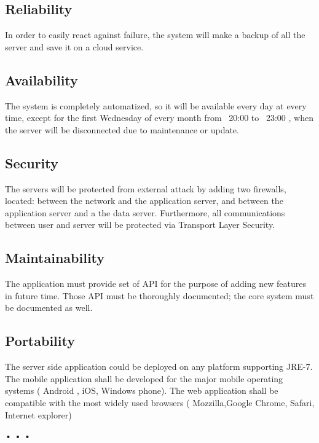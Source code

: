   \subsection{Reliability}
  In order to easily react against failure, the system will make a backup of all the server and save it on a cloud service.
  \subsection{Availability}
  The system is completely automatized, so it will be available every day at every time, except for the first Wednesday 
  of every month from ~20:00 to ~23:00 , when the server will be disconnected due to maintenance or update.
  \subsection{Security}
  The servers will be protected from external attack by adding two firewalls, located: between the network and the application server, 
  and between the application server and a the data server.
  Furthermore, all communications between user and server will be protected via Transport Layer Security.
  \subsection{Maintainability}
  The application must provide set of API for the purpose of adding new features in future time.
  Those API must be thoroughly documented; the core system must be documented as well.
  \subsection{Portability}
  The server side application could be deployed on any platform supporting JRE-7.\\
  The mobile application shall be developed for the major mobile operating systems ( Android , iOS, Windows phone).
  The web application shall be compatible with the most widely used browsers ( Mozzilla,Google Chrome, Safari, Internet explorer) %
  
 • • •
                                                                                                                                                                                                                                                                                                                                                                                                                                                                                                                                                                                                                                                                                                                                                                                                                                                                                                                                                                                                                                                                                                                  
